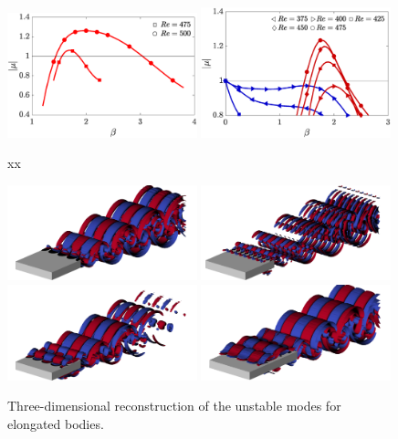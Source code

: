 \begin{figure}
  \includegraphics[width=0.49\textwidth]{./fig/AR7s/multipliers_AR7.eps}
  \includegraphics[width=0.49\textwidth]{./fig/AR9s/multipliers.eps}
  \caption{xx}
  \label{fig:multipliers_long}
\end{figure}

\begin{figure}
  \centering
  \includegraphics[width=0.49\textwidth]{./fig/AR5s/Floqetmode_beta_2_Re550_AR5p5_A.png}
  \includegraphics[width=0.49\textwidth]{./fig/AR5s/Floqetmode_beta_4p75_Re550_AR5p5_Ap.png}
  \includegraphics[width=0.49\textwidth]{./fig/AR5s/Floqetmode_beta_2_Re550_AR5p5_QS.png}   
  \includegraphics[width=0.49\textwidth]{./fig/AR9s/Floquet_AR9_Re450_beta2_modeQS.png}
  \caption{Three-dimensional reconstruction of the unstable modes for elongated bodies.}
  \label{fig:modes_long}
\end{figure}

